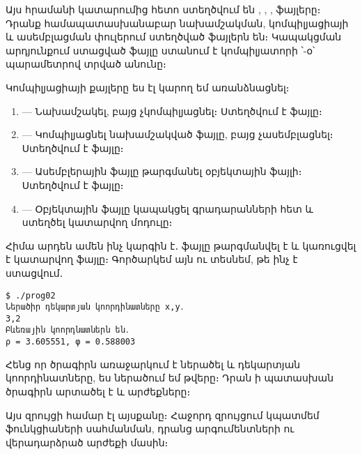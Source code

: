 Այս հրամանի կատարումից հետո ստեղծվում են ,
, ,  ֆայլերը։ Դրանք
համապատասխանաբար նախամշակման, կոմպիլյացիայի և ասեմբլացման փուլերում
ստեղծված ֆայլերն են։ Կապակցման արդյունքում ստացված ֆայլը ստանում է
կոմպիլյատորի ՝-օ՝ պարամետրով տրված անունը։

Կոմպիլյացիայի քայլերը ես էլ կարող եմ առանձնացնել։

\begin{enumerate}
\item {} --- Նախամշակել, բայց
  չկոմպիլյացնել։ Ստեղծվում է  ֆայլը։
\item {} --- Կոմպիլյացնել նախամշակված
  ֆայլը, բայց չասեմբլացնել։ Ստեղծվում է  ֆայլը։
\item {} --- Ասեմբլերային ֆայլը
  թարգմանել օբյեկտային ֆայլի։ Ստեղծվում է  ֆայլը։
\item {} --- Օբյեկտային ֆայլը կապակցել
  գրադարանների հետ և ստեղծել  կատարվող մոդուլը։
\end{enumerate}

Հիմա արդեն ամեն ինչ կարգին է․ ֆայլը թարգմանվել է և կառուցվել է
 կատարվող ֆայլը։ Գործարկեմ այն ու տեսնեմ, թե ինչ է
ստացվում․

\begin{verbatim}
$ ./prog02
Ներածիր դեկարտյան կոորդինատները x,y․
3,2
Բևեռային կոորդնատներն են․
ρ = 3.605551, φ = 0.588003
\end{verbatim}

Հենց որ ծրագիրն առաջարկում է ներածել  և  դեկարտյան
կոորդինատները, ես ներածում եմ  թվերը։ Դրան ի պատասխան
ծրագիրն արտածել է  և 
արժեքները։

Այս զրույցի համար էլ այսքանը։ Հաջորդ զրույցում կպատմեմ ֆունկցիաների
սահմանման, դրանց արգումենտների ու վերադարձրած արժեքի մասին։
